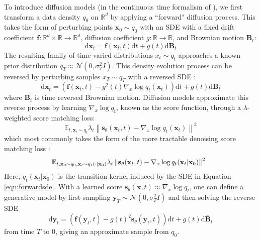 \documentclass{article}
\theoremstyle{plain}
\theoremstyle{definition}
\theoremstyle{remark}
\newcommand{\R}{\mathbb{R}}
\newcommand{\E}{\mathbb{E}}
\newcommand{\norm}[1]{\left\|#1\right\|}
\newcommand{\grad}{\nabla}
\renewcommand{\vec}{\mathbf}
\newcommand{\dd}{\mathrm{d}}
\begin{document}
To introduce diffusion models (in the continuous time formalism of \cite{Song2020ScoreBasedGM}), we first transform a data density $q_0$ on $\R^d$ by applying a ``forward" diffusion process. This takes the form of perturbing points $\vec{x}_0 \sim q_0$ with an SDE with a fixed drift coefficient $\vec{f}: \R^d \times \R \to \R^d$, diffusion coefficient $g: \R \to \R$, and Brownian motion $\vec{B}_t$:
\begin{equation}\label{eqn:forwardsde}
    \dd \vec{x}_t = \vec{f}(\vec{x}_t, t) \dd t + g(t) \dd \vec{B}_t
\end{equation}
The resulting family of time varied distributions $x_t \sim q_t$ approaches a known prior distribution $q_T \approx \mathcal{N}(0, \sigma_T^2 I)$. This density evolution process can be reversed by perturbing samples $x_T \sim q_T$ with a reversed SDE \citep{Anderson1982ReversetimeDE}:
\begin{equation}\label{eqn:backwardsde}
    \dd \vec{x}_t = (\vec{f}(\vec{x}_t, t) - g^2(t) \grad_x \log q_t(\vec{x}_t)) \dd t + g(t) \dd \overline{\vec{B}}_t
\end{equation}
where $\overline{\vec{B}}_t$ is time reversed Brownian motion. Diffusion models approximate this reverse process by learning $\grad_x \log q_t$, known as the score function, through a $\lambda$-weighted score matching loss:
\begin{equation}\label{eqn:weightedscorematching}
    \E_{t, \vec{x}_t \sim q_t} \lambda_t \norm{\vec{s}_\theta(\vec{x}_t, t) - \grad_x \log q_t(\vec{x}_t)}^2
\end{equation}
which most commonly takes the form of the more tractable denoising score matching loss \citep{Vincent2011ACB}:
\begin{equation}\label{eqn:weighteddenoisescorematching}
    \hspace*{-1.75mm}\E_{t, \vec{x}_0 \sim q_0, \vec{x}_t \sim q_t (\cdot | \vec{x}_0)}\lambda_t \norm{\vec{s}_\theta(\vec{x}_t, t) - \grad_x \log q_t(\vec{x}_t | \vec{x}_0)}^2
\end{equation}
Here, $q_t(\vec{x}_t | \vec{x}_0)$ is the transition kernel induced by the SDE in Equation \ref{eqn:forwardsde}. With a learned score $\vec{s}_\theta(\vec{x}, t) \approx \grad_x \log q_t$, one can define a generative model by first sampling $\vec{y}_T \sim \mathcal{N}(0, \sigma_T^2 I)$ and then solving the reverse SDE
\begin{equation}\label{eqn:diffmodelsde}
    \dd \vec{y}_t = (\vec{f}(\vec{y}_t, t) - g(t)^2 \vec{s}_\theta(\vec{y}_t, t)) \dd t + g(t) \dd \overline{\vec{B}}_t
\end{equation}
from time $T$ to $0$, giving an approximate sample from $q_0$.
\end{document}
